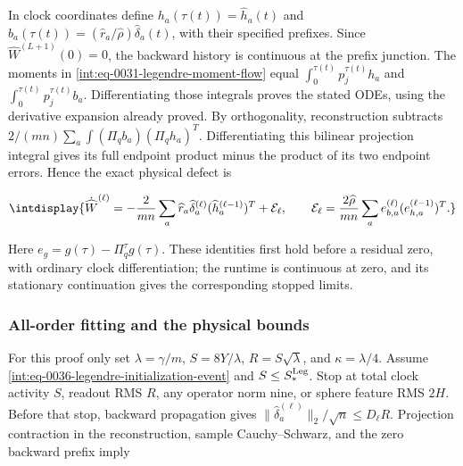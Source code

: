 
In clock coordinates define \(h_a(\tau(t))=\widehat h_a(t)\) and \(b_a(\tau(t))=(\widehat r_a/\widehat\rho) \widehat\delta_a(t)\), with their specified prefixes. Since \(\widehat W^{(L+1)}(0)=0\), the backward history is continuous at the prefix junction. The moments in \eqref{int:eq-0031-legendre-moment-flow} equal \(\int_0^{\tau(t)}p_j^{\tau(t)}h_a\) and \(\int_0^{\tau(t)}p_j^{\tau(t)}b_a\). Differentiating those integrals proves the stated ODEs, using the derivative expansion already proved. By orthogonality, reconstruction subtracts \(2/(mn)\sum_a\int(\Pi_qb_a)(\Pi_qh_a)^T\). Differentiating this bilinear projection integral gives its full endpoint product minus the product of its two endpoint errors. Hence the exact physical defect is


\begingroup\renewcommand{\theHequation}{intdisplay.520}
\begin{equation}
\intdisplay{
\dot{\widehat W}^{(\ell)}
=-\frac2{mn}\sum_a\widehat r_a\widehat\delta_a^{(\ell)}
(\widehat h_a^{(\ell-1)})^T+\mathcal E_\ell,
\qquad
\mathcal E_\ell=
\frac{2\widehat\rho}{mn}\sum_a e_{b,a}^{(\ell)}
(e_{h,a}^{(\ell-1)})^T.
}
\label{int:eq-0221-legendre-exact-defect}
\end{equation}
\endgroup


Here \(e_g=g(\tau)-\Pi_q^\tau g(\tau)\). These identities first hold before a residual zero, with ordinary clock differentiation; the runtime is continuous at zero, and its stationary continuation gives the corresponding stopped limits.


\subsubsection{All-order fitting and the physical bounds}
\label{int:legendre-fitting-proof}


For this proof only set \(\lambda=\gamma/m\), \(S=8Y/\lambda\), \(R=S\sqrt\lambda\), and \(\kappa=\lambda/4\). Assume \eqref{int:eq-0036-legendre-initialization-event} and \(S\le S_*^{\rm Leg}\). Stop at total clock activity \(S\), readout RMS \(R\), any operator norm nine, or sphere feature RMS \(2H\). Before that stop, backward propagation gives \(\|\widehat\delta_a^{(\ell)}\|_2/\sqrt n\le D_\ell R\). Projection contraction in the reconstruction, sample Cauchy--Schwarz, and the zero backward prefix imply


